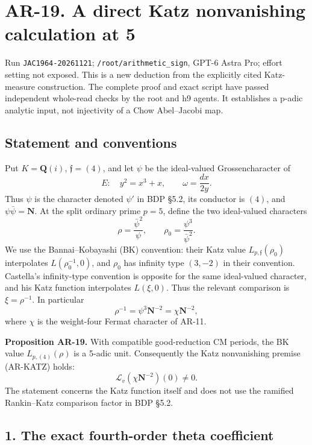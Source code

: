 \section{AR-19. A direct Katz nonvanishing calculation at
5}\label{ar-19.-a-direct-katz-nonvanishing-calculation-at-5}

Run \texttt{JAC1964-20261121}; \texttt{/root/arithmetic\_sign}, GPT-6
Astra Pro; effort setting not exposed. This is a new deduction from the
explicitly cited Katz-measure construction. The complete proof and exact
script have passed independent whole-read checks by the root and h9
agents. It establishes a p-adic analytic input, not injectivity of a
Chow Abel--Jacobi map.

\subsection{Statement and conventions}\label{statement-and-conventions}

Put \(K=\mathbf Q(i)\), \(\mathfrak f=(4)\), and let \(\psi\) be the
ideal-valued Grossencharacter of \[
E:\quad y^2=x^3+x,\qquad \omega=\frac{dx}{2y}.
\] Thus \(\psi\) is the character denoted \(\psi'\) in BDP §5.2, its
conductor is \((4)\), and \(\psi\bar\psi=\mathbf N\). At the split
ordinary prime \(p=5\), define the two ideal-valued characters \[
\rho=\frac{\bar\psi^2}{\psi},\qquad
\rho_0=\frac{\psi^3}{\bar\psi^2}.
\tag{AR19.1}
\] We use the Bannai--Kobayashi (BK) convention: their Katz value
\(L_{p,\mathfrak f}(\rho_0)\) interpolates \(L(\rho_0^{-1},0)\), and
\(\rho_0\) has infinity type \((3,-2)\) in their convention. Castella's
infinity-type convention is opposite for the same ideal-valued
character, and his Katz function interpolates \(L(\xi,0)\). Thus the
relevant comparison is \(\xi=\rho^{-1}\). In particular \[
\rho^{-1}=\psi^3\mathbf N^{-2}=\chi\mathbf N^{-2},
\] where \(\chi\) is the weight-four Fermat character of AR-11.

\textbf{Proposition AR-19.} With compatible good-reduction CM periods,
the BK value \(L_{p,(4)}(\rho)\) is a 5-adic unit. Consequently the Katz
nonvanishing premise (AR-KATZ) holds: \[
\mathcal L_v(\chi\mathbf N^{-2})(0)\ne0.
\tag{AR19.2}
\] The statement concerns the Katz function itself and does not use the
ramified Rankin--Katz comparison factor in BDP §5.2.

\subsection{1. The exact fourth-order theta
coefficient}\label{the-exact-fourth-order-theta-coefficient}

